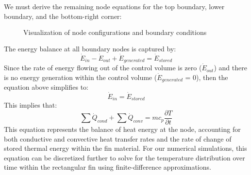 \documentclass{article}
\newcommand{\pderiv}[2]{\displaystyle \frac{\partial #1}{\partial #2}}
\begin{document}
We must derive the remaining node equations for the top boundary, lower boundary, and the bottom-right corner:

\begin{figure}[h]
    \centering
    \hspace{0.5cm}
    \hspace{0.5cm}
    \caption{Visualization of node configurations and boundary conditions}
    \label{fig:nodes}
\end{figure}

The energy balance at all boundary nodes is captured by:
\[
\dot{E}_{in} - \dot{E}_{out} + \dot{E}_{generated} = \dot{E}_{stored}    
\]
Since the rate of energy flowing out of the control volume is zero ($\dot{E}_{out}$) and there is no energy generation within the control volume ($\dot{E}_{generated}$ = 0), then the equation above simplifies to:
\[
\dot{E}_{in} = \dot{E}_{stored}    
\]
This implies that:
\begin{equation}
    \sum{\dot{Q}_{cond}} + \sum{\dot{Q}_{conv}} = m c_p \pderiv{T}{t}
    \label{eq:energy}
\end{equation}  
This equation represents the balance of heat energy at the node, accounting for both conductive and convective heat transfer rates and the rate of change of stored thermal energy within the fin material. For our numerical simulations, this equation can be discretized further to solve for the temperature distribution over time within the rectangular fin using finite-difference approximations.
\end{document}
